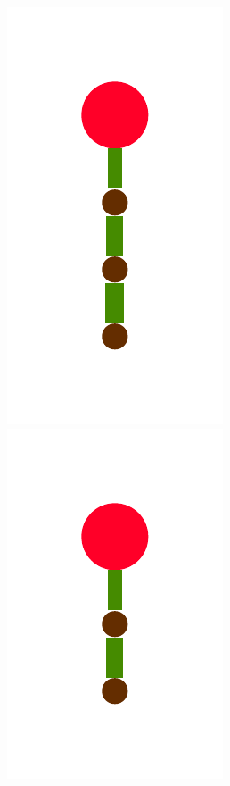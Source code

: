 \documentclass[a4paper,10pt]{article}
\begin{document}
\begin{figure}
{    \includegraphics[scale=.2]{./figures/4-2-3-recursion-post-5.pdf}
    \includegraphics[scale=.2]{./figures/4-2-3-recursion-post-6.pdf}
}
\end{figure}
\end{document}
